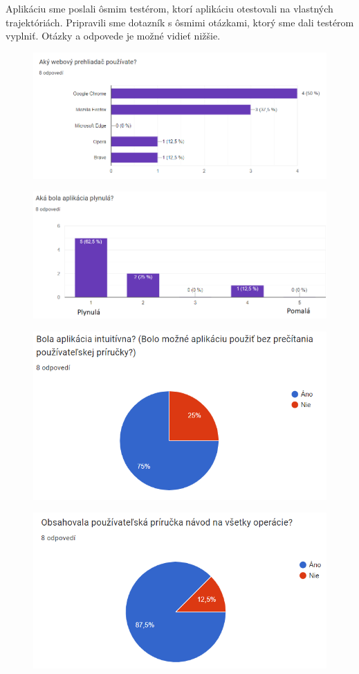 Aplikáciu sme poslali ôsmim testérom, ktorí aplikáciu otestovali na vlastných trajektóriách. Pripravili sme dotazník s ôsmimi otázkami, ktorý sme dali testérom vyplniť. Otázky a odpovede je možné vidieť nižšie. 
\begin{figure}[H]
  \centering
  \includegraphics[width=.7\textwidth]{img/dotaznik/1.png}
\end{figure}
\begin{figure}[H]
  \centering
  \includegraphics[width=.7\textwidth]{img/dotaznik/2.png}
\end{figure}
\begin{figure}[H]
  \centering
  \includegraphics[width=.7\textwidth]{img/dotaznik/3.png}
\end{figure}
\begin{figure}[H]
  \centering
  \includegraphics[width=.7\textwidth]{img/dotaznik/4.png}
\end{figure}
